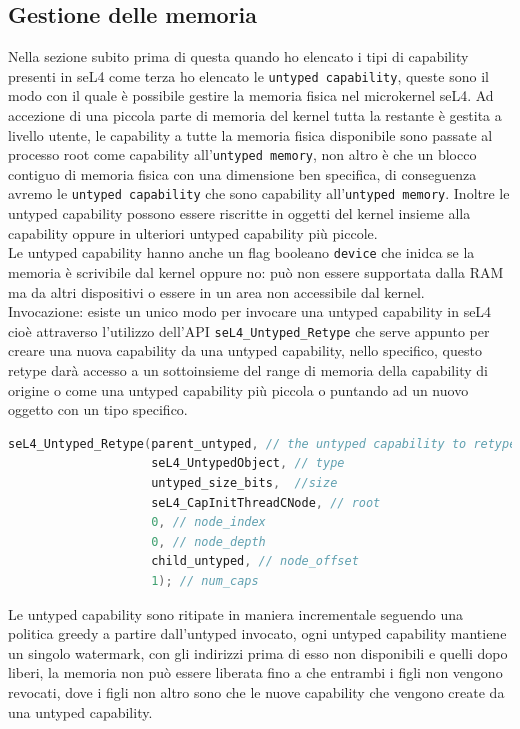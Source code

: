 \subsection{Gestione delle memoria}
Nella sezione subito prima di questa quando ho elencato i tipi di capability presenti in seL4 come terza ho elencato le \texttt{untyped capability}, queste sono il modo con il quale è possibile gestire la memoria fisica nel microkernel seL4. Ad accezione di una piccola parte di memoria del kernel tutta la restante è gestita a livello utente, le capability a tutte la memoria fisica disponibile sono passate al processo root come capability all'\texttt{untyped memory}, non altro è che un blocco contiguo di memoria fisica con una dimensione ben specifica, di conseguenza avremo le \texttt{untyped capability} che sono capability all'\texttt{untyped memory}. Inoltre le untyped capability possono essere riscritte in oggetti del kernel insieme alla capability oppure in ulteriori untyped capability più piccole.\\
Le untyped capability hanno anche un flag booleano \texttt{device} che inidca se la memoria è scrivibile dal kernel oppure no: può non essere supportata dalla RAM ma da altri dispositivi o essere in un area non accessibile dal kernel.\\
Invocazione: esiste un unico modo per invocare una untyped capability in seL4 cioè attraverso l'utilizzo dell'API \texttt{seL4\_Untyped\_Retype} che serve appunto per creare una nuova capability da una untyped capability, nello specifico, questo retype darà accesso a un sottoinsieme del range di memoria della capability di origine o come una untyped capability più piccola o puntando ad un nuovo oggetto con un tipo specifico.
\begin{lstlisting}[language=C++]
seL4_Untyped_Retype(parent_untyped, // the untyped capability to retype
                    seL4_UntypedObject, // type
                    untyped_size_bits,  //size
                    seL4_CapInitThreadCNode, // root
                    0, // node_index
                    0, // node_depth
                    child_untyped, // node_offset
                    1); // num_caps
\end{lstlisting}
Le untyped capability sono ritipate in maniera incrementale seguendo una politica greedy a partire dall'untyped invocato, ogni untyped capability mantiene un singolo watermark, con gli indirizzi prima di esso non disponibili e quelli dopo liberi, la memoria non può essere liberata fino a che entrambi i figli non vengono revocati, dove i figli non altro sono che le nuove capability che vengono create da una untyped capability.\\
